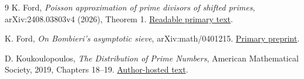 \documentclass[11pt]{article}
\theoremstyle{remark}
\begin{document}
\begin{thebibliography}{9}\small
{}
K. Ford, \emph{Poisson approximation of prime divisors of shifted primes},
arXiv:2408.03803v4 (2026), Theorem 1.
\href{https://arxiv.org/html/2408.03803v4}{Readable primary text}.

K. Ford, \emph{On Bombieri's asymptotic sieve},
arXiv:math/0401215.
\href{https://arxiv.org/abs/math/0401215}{Primary preprint}.

D. Koukoulopoulos, \emph{The Distribution of Prime Numbers},
American Mathematical Society, 2019, Chapters 18--19.
\href{https://dms.umontreal.ca/~koukoulo/documents/publications/primes.pdf}{Author-hosted text}.
\end{thebibliography}
\end{document}
